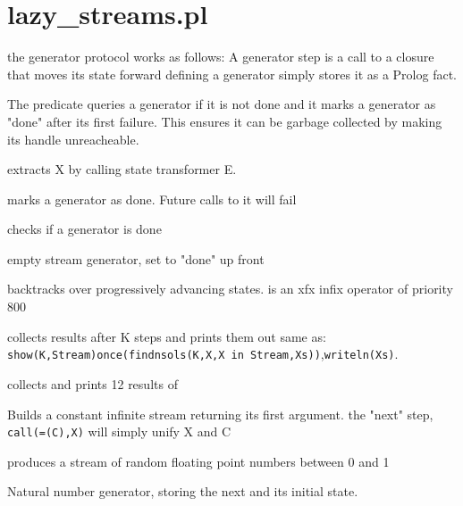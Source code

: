 \documentclass[11pt]{article}
\begin{document}



\section{lazy_streams.pl}

\label{sec:lazystreams}

\begin{description}
the  generator protocol works as follows:
A generator step is a call to a closure that moves its state forward
defining a generator simply stores it as a Prolog fact.

The predicate  queries a generator if it is not done and
it marks a generator as "done" after its first failure.
This ensures it can be garbage collected
by making its handle unreacheable.

 extracts X by calling state transformer E.

 marks a generator as done.
Future calls to it will fail

checks if a generator is done

empty stream generator, set to "done" up front

 backtracks over progressively advancing states.
 is an xfx infix operator of priority 800

 collects results after K steps and prints them out
same as: \verb$show(K,Stream)$\Sneck{}\verb$once(findnsols(K,X,X in Stream,Xs))$,\verb$writeln(Xs)$.

collects and prints 12 results of 

Builds a constant infinite stream returning its first argument.
the "next" step, \verb$call(=(C),X)$ will simply unify X and C

produces a stream of random floating point numbers between 0 and 1

Natural number generator, storing the next and its initial state.


\end{description}
\end{document}
